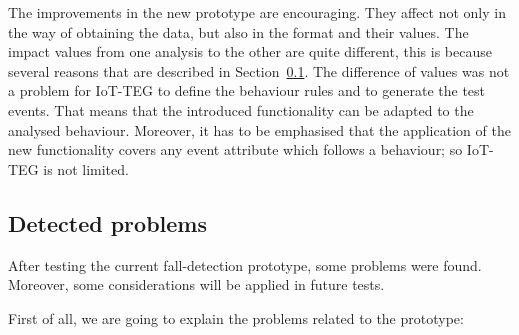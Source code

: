 \documentclass[journal]{IEEEtran}
\begin{document}
The improvements in the new prototype are encouraging. They affect not only in the way of obtaining the data, but 
also in the format and their values. The impact values from one analysis to the other are quite different, 
this is because several reasons that are described in Section~\ref{sub:detectedproblems}. The difference
of values was not a problem for IoT-TEG to define the behaviour rules and to generate the test events. That
means that the introduced functionality can be adapted to the analysed
behaviour. Moreover, it has to be emphasised that the application of the new functionality covers any event attribute which follows a behaviour;
so IoT-TEG is not limited.

\subsection{Detected problems}
\label{sub:detectedproblems}

After testing the current fall-detection prototype, some problems were 
found. Moreover, some considerations will be applied in future tests.

First of all, we are going to explain the problems related to the prototype: 
\end{document}
